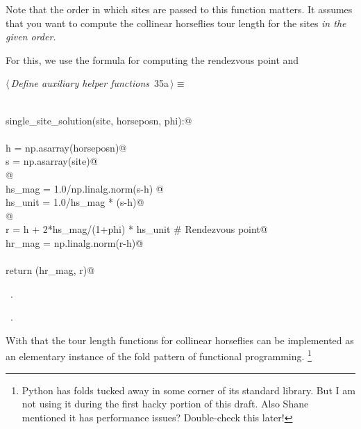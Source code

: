 \documentclass[11.5pt]{report}
\begin{document}
Note that the order in which sites are passed to this function matters. It 
assumes that you want to compute the collinear horseflies tour length for the 
sites \textit{in the given order.} 

For this, we use the formula for computing the rendezvous point and  

\begin{center}
\end{center}

\begin{flushleft} \small\label{scrap29}\raggedright\small
{} $\langle\,${\itshape Define auxiliary helper functions}\nobreak\ {\footnotesize {35a}}$\,\rangle\equiv$
\vspace{-1ex}
\begin{list}{}{} \item
\mbox{}\verb@@\\
\mbox{}\verb@def single_site_solution(site, horseposn, phi):@\\
\mbox{}\verb@@\\
\mbox{}\verb@     h = np.asarray(horseposn)@\\
\mbox{}\verb@     s = np.asarray(site)@\\
\mbox{}\verb@     @\\
\mbox{}\verb@     hs_mag  = 1.0/np.linalg.norm(s-h) @\\
\mbox{}\verb@     hs_unit = 1.0/hs_mag * (s-h)@\\
\mbox{}\verb@     @\\
\mbox{}\verb@     r      = h +  2*hs_mag/(1+phi) * hs_unit # Rendezvous point@\\
\mbox{}\verb@     hr_mag = np.linalg.norm(r-h)@\\
\mbox{}\verb@@\\
\mbox{}\verb@     return (hr_mag, r)@\\
\mbox{}\verb@@{\NWsep}
\end{list}
\vspace{-1.5ex}
\footnotesize
\begin{list}{}{\setlength{\itemsep}{-\parsep}\setlength{\itemindent}{-\leftmargin}}
\item \NWtxtMacroDefBy\ .
\item \NWtxtMacroRefIn\ .

\item{}
\end{list}
\vspace{4ex}
\end{flushleft}
With that the tour length functions for collinear horseflies can be implemented as 
an elementary instance of the fold pattern of functional programming. 
\footnote{Python has folds tucked away in some corner of its standard library. 
But I am not using it during the first hacky portion of this draft. Also Shane 
mentioned it has performance issues? Double-check this later!}
\end{document}
